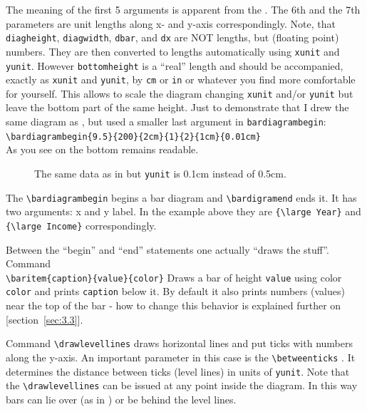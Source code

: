 \documentclass[12pt]{article}
\begin{document}
The meaning of the first 5 arguments is apparent from the
. The 6th and the 7th parameters are unit lengths along
x- and y-axis correspondingly. Note, that \texttt{diagheight},
\texttt{diagwidth}, \texttt{dbar}, and \texttt{dx} are NOT lengths, but
(floating point) numbers. They are then converted to lengths
automatically using \texttt{xunit} and \texttt{yunit}. However
\texttt{bottomheight} is a ``real'' length and should be accompanied,
exactly as \texttt{xunit} and \texttt{yunit}, by \texttt{cm} or
\texttt{in} or whatever you find more comfortable for yourself. This
allows to scale the diagram changing \texttt{xunit} and/or
\texttt{yunit} but leave the bottom part of the same height. Just to
demonstrate that I drew the same diagram
 as , but used a
smaller last argument in \texttt{bardiagrambegin}:\\
\verb+\bardiagrambegin{9.5}{200}{2cm}{1}{2}{1cm}{0.01cm}+\\
As you see on  the bottom remains readable.
\begin{figure}[!ht]\centering
  
\caption{\label{fig:3} The same data as in  but 
          \texttt{yunit} is 0.1cm instead of 0.5cm.}
\end{figure}

The \verb+\bardiagrambegin+ begins a bar diagram and 
\verb+\bardigramend+ 
ends it. It has two arguments: x and y label. In
the example above they are \verb+{\large Year}+ and 
\verb+{\large Income}+ correspondingly. 

Between the ``begin'' and ``end'' statements
one actually ``draws the stuff''. Command\\ 
\verb+\baritem{caption}{value}{color}+ 
Draws a bar of height \texttt{value} using color \texttt{color} and
prints \texttt{caption} below it. By default it also prints numbers
(values) near the top of the bar - how to change this behavior is
explained further on [section~\ref{sec:3.3}].

Command \verb+\drawlevellines+ draws horizontal lines and put ticks
with numbers along the y-axis. An important parameter in this case is
the \verb+\betweenticks+ . It
determines the distance between ticks (level lines) in units of
\texttt{yunit}. Note that the \verb+\drawlevellines+ can be issued at
any point inside the diagram. In this way bars can lie over (as in
) or be behind the level lines.
      
\end{document}

